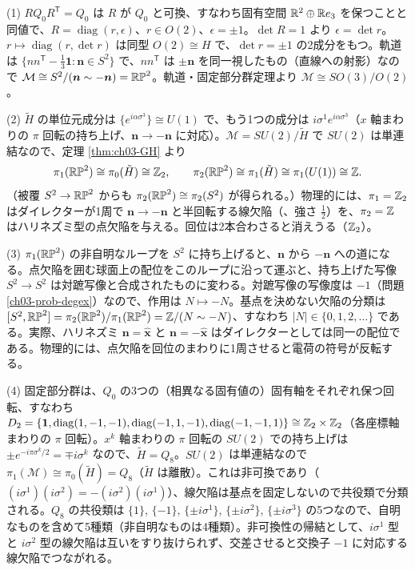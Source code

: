 \begin{solution}
(1) $RQ_0R^{\mathsf T}=Q_0$ は $R$ が $Q_0$ と可換、すなわち固有空間 $\mathbb{R}^2\oplus\mathbb{R} e_3$ を保つことと同値で、$R=\operatorname{diag}(r,\epsilon)$、$r\in O(2)$、$\epsilon=\pm1$。$\det R=1$ より $\epsilon=\det r$。$r\mapsto\operatorname{diag}(r,\det r)$ は同型 $O(2)\cong H$ で、$\det r=\pm1$ の2成分をもつ。軌道は $\{n n^{\mathsf T}-\frac13\mathbf 1:\bm n\in S^2\}$ で、$nn^{\mathsf T}$ は $\pm\bm n$ を同一視したもの（直線への射影）なので $\mathcal M\cong S^2/(\bm n\sim-\bm n)=\mathbb{RP}^2$。軌道・固定部分群定理より $\mathcal M\cong SO(3)/O(2)$。

(2) $\tilde H$ の単位元成分は $\{e^{i\alpha\sigma^3}\}\cong U(1)$ で、もう1つの成分は $i\sigma^1e^{i\alpha\sigma^3}$（$x$ 軸まわりの $\pi$ 回転の持ち上げ、$\bm n\to-\bm n$ に対応）。$\mathcal M=SU(2)/\tilde H$ で $SU(2)$ は単連結なので、定理 \ref{thm:ch03-GH} より
\[
\pi_1(\mathbb{RP}^2)\cong\pi_0(\tilde H)\cong\mathbb{Z}_2,\qquad\pi_2(\mathbb{RP}^2)\cong\pi_1(\tilde H)\cong\pi_1(U(1))\cong\mathbb{Z} .
\]
（被覆 $S^2\to\mathbb{RP}^2$ からも $\pi_2(\mathbb{RP}^2)\cong\pi_2(S^2)$ が得られる。）物理的には、$\pi_1=\mathbb{Z}_2$ はダイレクターが1周で $\bm n\to-\bm n$ と半回転する線欠陥（、強さ $\frac12$）を、$\pi_2=\mathbb{Z}$ はハリネズミ型の点欠陥を与える。回位は2本合わさると消えうる（$\mathbb{Z}_2$）。

(3) $\pi_1(\mathbb{RP}^2)$ の非自明なループを $S^2$ に持ち上げると、$\bm n$ から $-\bm n$ への道になる。点欠陥を囲む球面上の配位をこのループに沿って運ぶと、持ち上げた写像 $S^2\to S^2$ は対蹠写像と合成されたものに変わる。対蹠写像の写像度は $-1$（問題 \ref{ch03-prob-degex}）なので、作用は $N\mapsto-N$。基点を決めない欠陥の分類は $[S^2,\mathbb{RP}^2]=\pi_2(\mathbb{RP}^2)/\pi_1(\mathbb{RP}^2)=\mathbb{Z}/(N\sim-N)$、すなわち $\lvert N\rvert\in\{0,1,2,\dots\}$ である。実際、ハリネズミ $\bm n=\hat{\bm x}$ と $\bm n=-\hat{\bm x}$ はダイレクターとしては同一の配位である。物理的には、点欠陥を回位のまわりに1周させると電荷の符号が反転する。

(4) 固定部分群は、$Q_0$ の3つの（相異なる固有値の）固有軸をそれぞれ保つ回転、すなわち $D_2=\{\mathbf 1,\operatorname{diag}(1,-1,-1),\operatorname{diag}(-1,1,-1),\operatorname{diag}(-1,-1,1)\}\cong\mathbb{Z}_2\times\mathbb{Z}_2$（各座標軸まわりの $\pi$ 回転）。$x^k$ 軸まわりの $\pi$ 回転の $SU(2)$ での持ち上げは $\pm e^{-i\pi\sigma^k/2}=\mp i\sigma^k$ なので、$\tilde H=Q_8$。$SU(2)$ は単連結なので $\pi_1(\mathcal M)\cong\pi_0(\tilde H)=Q_8$（$\tilde H$ は離散）。これは非可換であり（$(i\sigma^1)(i\sigma^2)=-(i\sigma^2)(i\sigma^1)$）、線欠陥は基点を固定しないので共役類で分類される。$Q_8$ の共役類は $\{1\}$, $\{-1\}$, $\{\pm i\sigma^1\}$, $\{\pm i\sigma^2\}$, $\{\pm i\sigma^3\}$ の5つなので、自明なものを含めて5種類（非自明なものは4種類）。非可換性の帰結として、$i\sigma^1$ 型と $i\sigma^2$ 型の線欠陥は互いをすり抜けられず、交差させると交換子 $-1$ に対応する線欠陥でつながれる。
\end{solution}

